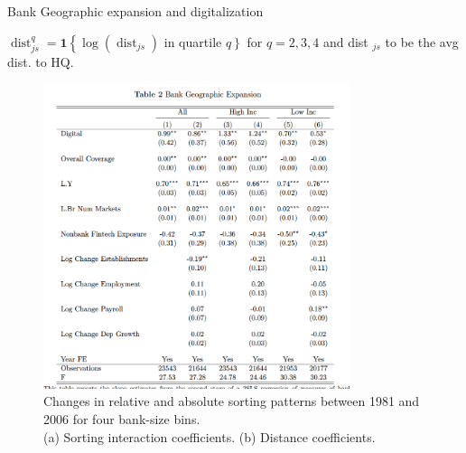 \documentclass[notes,10pt, aspectratio=169]{beamer}
\newenvironment{wideitemize}{\itemize\addtolength{\itemsep}{10pt}}{\enditemize}
\begin{document}
\begin{frame}{Bank Geographic expansion and digitalization}

\begin{wideitemize}
\item   $\operatorname{dist}_{j s}^q=\mathbf{1}\left\{\log \left(\operatorname{dist}_{j s}\right)\right.$ in quartile $\left.q\right\}$ for $q=2,3,4$ and dist $_{j s}$ to be the avg dist. to HQ.  %

\end{wideitemize}
\begin{figure}
\centering
\includegraphics[width=0.8\textwidth]{imgs/tab2.png}
\caption*{Changes in relative and absolute sorting patterns between 1981 and 2006 for
four bank-size bins.\\ (a) Sorting interaction coefficients. (b) Distance coefficients.}
\label{fig:my_label}
\end{figure}





\end{frame}
\end{document}
